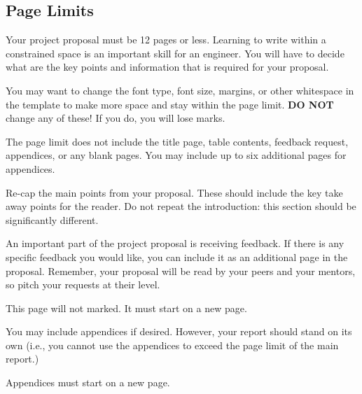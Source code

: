 \documentclass{capstone}
\begin{document}
\subsection*{Page Limits}

Your project proposal must be 12 pages or less. Learning to write within a constrained space is an important skill for an engineer. You will have to decide what are the key points and information that is required for your proposal.

You may want to change the font type, font size, margins, or other whitespace in the template to make more space and stay within the page limit. \textbf{DO NOT} change any of these! If you do, you will lose marks.

The page limit does not include the title page, table contents, feedback request, appendices, or any blank pages. You may include up to six additional pages for appendices.

Re-cap the main points from your proposal. These should include the key take away points for the reader. Do not repeat the introduction: this section should be significantly different.

\newpage
{}

An important part of the project proposal is receiving feedback. If there is any specific feedback you would like, you can include it as an additional page in the proposal. Remember, your proposal will be read by your peers and your mentors, so pitch your requests at their level.

This page will not marked. It must start on a new page. 

\newpage
{}
You may include appendices if desired. However, your report should stand on its own (i.e., you cannot use the appendices to exceed the page limit of the main report.) 

Appendices must start on a new page.
\end{document}
